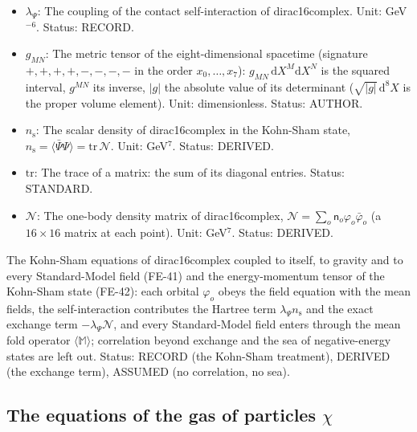 \documentclass[
  10pt,
]{article}
\begin{document}
\begin{itemize}
  for \(SU(2)\) with \(g_2\epsilon^{IJK}\)). Unit: 1/length. Status:
  STANDARD.
\item
  \(\lambda_\Psi\): The coupling of the contact self-interaction of
  dirac16complex. Unit: GeV\(^{-6}\). Status: RECORD.
\item
  \(g_{MN}\): The metric tensor of the eight-dimensional spacetime
  (signature \(+,+,+,+,-,-,-,-\) in the order \(x_0, \dots, x_7\)):
  \(g_{MN}\,\mathrm{d}X^M\mathrm{d}X^N\) is the squared interval,
  \(g^{MN}\) its inverse, \(\lvert g\rvert\) the absolute value of its
  determinant (\(\sqrt{\lvert g\rvert}\,\mathrm{d}^8X\) is the proper
  volume element). Unit: dimensionless. Status: AUTHOR.
\item
  \(n_{\mathrm{s}}\): The scalar density of dirac16complex in the
  Kohn-Sham state,
  \(n_{\mathrm{s}} = \langle\bar\Psi\Psi\rangle = \mathrm{tr}\,\mathcal{N}\).
  Unit: GeV\(^7\). Status: DERIVED.
\item
  \(\mathrm{tr}\): The trace of a matrix: the sum of its diagonal
  entries. Status: STANDARD.
\item
  \(\mathcal{N}\): The one-body density matrix of dirac16complex,
  \(\mathcal{N} = \sum_o\mathsf{n}_o\varphi_o\bar\varphi_o\) (a
  \(16 \times 16\) matrix at each point). Unit: GeV\(^7\). Status:
  DERIVED.
\end{itemize}

The Kohn-Sham equations of dirac16complex coupled to itself, to gravity
and to every Standard-Model field (FE-41) and the energy-momentum tensor
of the Kohn-Sham state (FE-42): each orbital \(\varphi_o\) obeys the
field equation with the mean fields, the self-interaction contributes
the Hartree term \(\lambda_\Psi n_{\mathrm{s}}\) and the exact exchange
term \(-\lambda_\Psi\mathcal{N}\), and every Standard-Model field enters
through the mean fold operator \(\langle\mathbb{M}\rangle\); correlation
beyond exchange and the sea of negative-energy states are left out.
Status: RECORD (the Kohn-Sham treatment), DERIVED (the exchange term),
ASSUMED (no correlation, no sea).

\hypertarget{the-equations-of-the-gas-of-particles-chi}{%
\subsection{\texorpdfstring{The equations of the gas of particles
\(\chi\)}{The equations of the gas of particles \textbackslash chi}}\label{the-equations-of-the-gas-of-particles-chi}}
\end{document}
